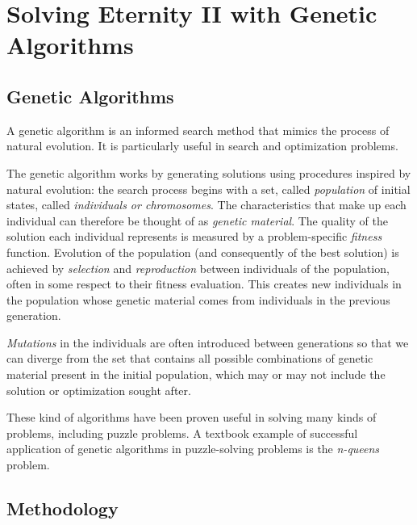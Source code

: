 \documentclass{llncs}
\begin{document}
\section{Solving Eternity II with Genetic Algorithms}\label{sec:genetic_algorithms}

\subsection{Genetic Algorithms}


A genetic algorithm is an informed search method that mimics the process of natural evolution. It is particularly useful in search and optimization problems.

The genetic algorithm works by generating solutions using procedures inspired by natural evolution: the search process begins with a set, called \textit{population} of initial states, called \textit{individuals or chromosomes}. The characteristics that make up each individual can therefore be thought of as \textit{genetic material}. The quality of the solution each individual represents is measured by a problem-specific \textit{fitness} function. Evolution of the population (and consequently of the best solution) is achieved by \textit{selection} and \textit{reproduction} between individuals of the population, often in some respect to their fitness evaluation. This creates new individuals in the population whose genetic material comes from individuals in the previous generation.\cite{peck_dhawan}

\textit{Mutations} in the individuals are often introduced between generations so that we can diverge from the set that contains all possible combinations of genetic material present in the initial population, which may or may not include the solution or optimization sought after.

These kind of algorithms have been proven useful in solving many kinds of problems, including puzzle problems. A textbook example of successful application of genetic algorithms in puzzle-solving problems is the \textit{n-queens} problem\cite{eastridge}.

\subsection{Methodology}\label{sec:methodology}
\end{document}

